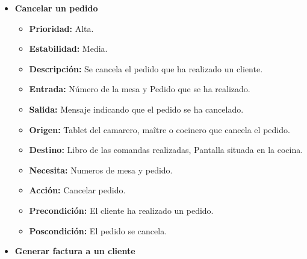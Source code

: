 \documentclass[spanish,a4paper,11pt, twoside]{report}	%
\begin{document}
\begin{itemize}
\begin{itemize}
		\end{itemize}%

	\item \textbf{Cancelar un pedido} %

		\begin{itemize}
			\item \textbf{Prioridad: } Alta.
			\item \textbf{Estabilidad: } Media.
			\item \textbf{Descripción: } Se cancela el pedido que ha realizado un cliente.
			\item \textbf{Entrada: } Número de la mesa y Pedido que se ha realizado.
			\item \textbf{Salida: } Mensaje indicando que el pedido se ha cancelado.
			\item \textbf{Origen: } Tablet del camarero, maître o cocinero que cancela el pedido.
			\item \textbf{Destino: } Libro de las comandas realizadas, Pantalla situada en la cocina.
			\item \textbf{Necesita: } Numeros de mesa y pedido.
			\item \textbf{Acción: } Cancelar pedido.
			\item \textbf{Precondición: } El cliente ha realizado un pedido.
			\item \textbf{Poscondición: } El pedido se cancela.

		\end{itemize}%

	\item \textbf{Generar factura a un cliente} %


\end{itemize}
\end{document}
